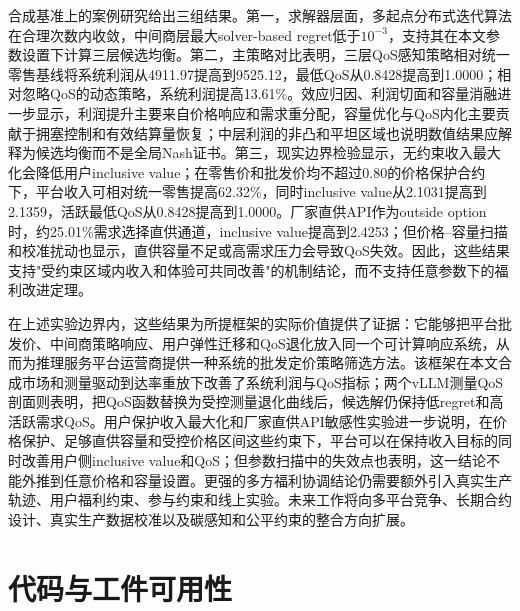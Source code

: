 \documentclass[UTF8,11pt]{ctexart}
\begin{document}
合成基准上的案例研究给出三组结果。第一，求解器层面，多起点分布式迭代算法在合理次数内收敛，中间商层最大solver-based regret低于$10^{-3}$，支持其在本文参数设置下计算三层候选均衡。第二，主策略对比表明，三层QoS感知策略相对统一零售基线将系统利润从4911.97提高到9525.12，最低QoS从0.8428提高到1.0000；相对忽略QoS的动态策略，系统利润提高13.61\%。效应归因、利润切面和容量消融进一步显示，利润提升主要来自价格响应和需求重分配，容量优化与QoS内化主要贡献于拥塞控制和有效结算量恢复；中层利润的非凸和平坦区域也说明数值结果应解释为候选均衡而不是全局Nash证书。第三，现实边界检验显示，无约束收入最大化会降低用户inclusive value；在零售价和批发价均不超过0.80的价格保护合约下，平台收入可相对统一零售提高62.32\%，同时inclusive value从2.1031提高到2.1359，活跃最低QoS从0.8428提高到1.0000。厂家直供API作为outside option时，约25.01\%需求选择直供通道，inclusive value提高到2.4253；但价格--容量扫描和校准扰动也显示，直供容量不足或高需求压力会导致QoS失效。因此，这些结果支持"受约束区域内收入和体验可共同改善"的机制结论，而不支持任意参数下的福利改进定理。

在上述实验边界内，这些结果为所提框架的实际价值提供了证据：它能够把平台批发价、中间商策略响应、用户弹性迁移和QoS退化放入同一个可计算响应系统，从而为推理服务平台运营商提供一种系统的批发定价策略筛选方法。该框架在本文合成市场和测量驱动到达率重放下改善了系统利润与QoS指标；两个vLLM测量QoS剖面则表明，把QoS函数替换为受控测量退化曲线后，候选解仍保持低regret和高活跃需求QoS。用户保护收入最大化和厂家直供API敏感性实验进一步说明，在价格保护、足够直供容量和受控价格区间这些约束下，平台可以在保持收入目标的同时改善用户侧inclusive value和QoS；但参数扫描中的失效点也表明，这一结论不能外推到任意价格和容量设置。更强的多方福利协调结论仍需要额外引入真实生产轨迹、用户福利约束、参与约束和线上实验。未来工作将向多平台竞争、长期合约设计、真实生产数据校准以及碳感知和公平约束的整合方向扩展。

\section{代码与工件可用性}
\label{sec:code_availability}
\end{document}
